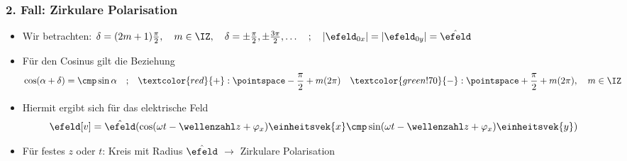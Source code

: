 \begin{frame}
  \frametitle{2. Fall: Zirkulare Polarisation}
  \begin{itemize}[<+->]
  \item Wir betrachten: \(\delta = (2m+1) \frac{\pi}{2}, \quad m \in \IZ , \quad\delta = \pm \frac{\pi}{2}, \pm \frac{3\pi}{2},\ldots \quad ;\quad\vert \efeld_{0x} \vert = \vert \efeld_{0y} \vert = \hat{\efeld} \)
  \item Für den Cosinus gilt die Beziehung
    \begin{align*}
\begin{split}
 \cos ( \alpha + \delta ) = \cmp \sin \alpha \quad;\quad &\textcolor{red}{+} : \pointspace -\frac{\pi}{2} + m (2\pi) \quad\textcolor{green!70}{-} : \pointspace  +\frac{\pi}{2} + m (2 \pi), \quad m \in \IZ
\end{split}
\end{align*}
\item Hiermit ergibt sich für das elektrische Feld
\begin{align*}
  \efeld[v] &= \hat{\efeld}(\cos(\omega t - \wellenzahl z + \varphi_x)\einheitsvek{x} \cmp \sin (\omega t - \wellenzahl z + \varphi_x)\einheitsvek{y})
\end{align*}
\item Für festes \(z\) oder \(t\): Kreis mit Radius \(\hat{\efeld}\)
  \(\to\) \alert{Zirkulare Polarisation}
  \medskip
  

\end{itemize}
\end{frame}
